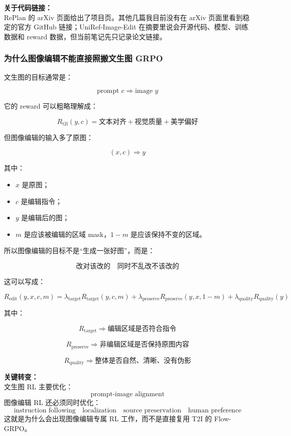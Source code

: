 \begin{warnbox}
\textbf{关于代码链接：}\\
RePlan 的 arXiv 页面给出了项目页。其他几篇我目前没有在 arXiv 页面里看到稳定的官方 GitHub 链接；UniRef-Image-Edit 在摘要里说会开源代码、模型、训练数据和 reward 数据，但当前笔记先只记录论文链接。
\end{warnbox}

\subsubsection{为什么图像编辑不能直接照搬文生图 GRPO}

文生图的目标通常是：

\[
\text{prompt } c
\Rightarrow
\text{image } y
\]

它的 reward 可以粗略理解成：

\[
R_\text{t2i}(y,c)
=
\text{文本对齐}
+
\text{视觉质量}
+
\text{美学偏好}
\]

但图像编辑的输入多了原图：

\[
(x,c)
\Rightarrow
y
\]

其中：

\begin{itemize}[leftmargin=1.5em]
  \item $x$ 是原图；
  \item $c$ 是编辑指令；
  \item $y$ 是编辑后的图；
  \item $m$ 是应该被编辑的区域 mask，$1-m$ 是应该保持不变的区域。
\end{itemize}

所以图像编辑的目标不是“生成一张好图”，而是：

\[
\text{改对该改的}
\quad
\text{同时不乱改不该改的}
\]

这可以写成：

\[
R_\text{edit}(y,x,c,m)
=
\lambda_\text{target}R_\text{target}(y,c,m)
+
\lambda_\text{preserve}R_\text{preserve}(y,x,1-m)
+
\lambda_\text{quality}R_\text{quality}(y)
\]

其中：

\[
R_\text{target}
\Rightarrow
\text{编辑区域是否符合指令}
\]

\[
R_\text{preserve}
\Rightarrow
\text{非编辑区域是否保持原图内容}
\]

\[
R_\text{quality}
\Rightarrow
\text{整体是否自然、清晰、没有伪影}
\]

\begin{summarybox}
\textbf{关键转变：}\\
文生图 RL 主要优化：
\[
\text{prompt-image alignment}
\]
图像编辑 RL 还必须同时优化：
\[
\text{instruction following}
\quad
\text{localization}
\quad
\text{source preservation}
\quad
\text{human preference}
\]
这就是为什么会出现图像编辑专属 RL 工作，而不是直接复用 T2I 的 Flow-GRPO。
\end{summarybox}

